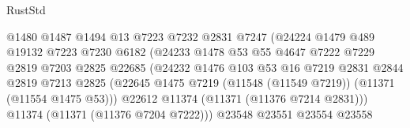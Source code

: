 \begin{lexlean}{RustStd}
\begin{coremodule}
                                        @1480
                                        @1487
                                        @1494
                                        @13
                                        @7223
                                        @7232
                                        @2831
                                        @7247
                                        (@24224
                                          @1479
                                          @489
                                          @19132
                                          @7223
                                          @7230
                                          @6182
                                          (@24233
                                            @1478
                                            @53
                                            @55
                                            @4647
                                            @7222
                                            @7229
                                            @2819
                                            @7203
                                            @2825
                                            @22685
                                            (@24232
                                              @1476
                                              @103
                                              @53
                                              @16
                                              @7219
                                              @2831
                                              @2844
                                              @2819
                                              @7213
                                              @2825
                                              (@22645
                                                @1475
                                                @7219
                                                (@11548 (@11549 @7219))
                                                (@11371 (@11554 @1475 @53)))
                                              @22612
                                              @11374
                                              (@11371 (@11376 @7214 @2831)))
                                            @11374
                                            (@11371 (@11376 @7204 @7222)))
                                          @23548
                                          @23551
                                          @23554
                                          @23558

\end{coremodule}
\end{lexlean}

